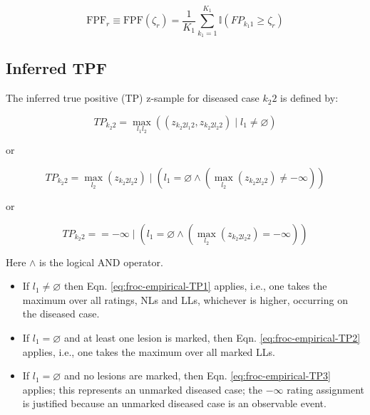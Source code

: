 \documentclass[
]{book}
\begin{document}
\begin{equation}
\text{FPF}_r \equiv \text{FPF} \left ( \zeta_r \right ) = \frac{1}{K_1} \sum_{k_1=1}^{K_1} \mathbb{I} \left ( FP_{k_1 1} \geq \zeta_r\right )
\label{eq:froc-empirical-FPF}
\end{equation}

\hypertarget{inferred-tpf}{%
\subsection{Inferred TPF}\label{inferred-tpf}}

The inferred true positive (TP) z-sample for diseased case \(k_2 2\) is defined by:

\begin{equation}
TP_{k_2 2} = \textstyle\max_{l_1 l_2}\left ( \left (z_{k_2 2 l_1 2} ,z_{k_2 2 l_2 2}  \right ) \mid l_1 \neq \varnothing \right )
\label{eq:froc-empirical-TP1}
\end{equation}

or

\begin{equation}
TP_{k_2 2} = \textstyle\max_{l_2}  \left ( z_{k_2 2 l_2 2}  \right )  \mid\left ( l_1 = \varnothing \land \left (\textstyle\max_{l_2}{\left (z_{k_2 2 l_2 2}  \right )} \neq -\infty  \right )  \right )
\label{eq:froc-empirical-TP2}
\end{equation}

or

\begin{equation}
TP_{k_2 2} = = -\infty \mid \left ( l_1 = \varnothing \land\left ( \textstyle\max_{l_2}{\left (z_{k_2 2 l_2 2}  \right )} = -\infty  \right )  \right )
\label{eq:froc-empirical-TP3}
\end{equation}

Here \(\land\) is the logical AND operator.

\begin{itemize}
\item
  If \(l_1 \neq \varnothing\) then Eqn. \eqref{eq:froc-empirical-TP1} applies, i.e., one takes the maximum over all ratings, NLs and LLs, whichever is higher, occurring on the diseased case.
\item
  If \(l_1 = \varnothing\) and at least one lesion is marked, then Eqn. \eqref{eq:froc-empirical-TP2} applies, i.e., one takes the maximum over all marked LLs.
\item
  If \(l_1 = \varnothing\) and no lesions are marked, then Eqn. \eqref{eq:froc-empirical-TP3} applies; this represents an unmarked diseased case; the \(-\infty\) rating assignment is justified because an unmarked diseased case is an observable event.
\end{itemize}
\end{document}
